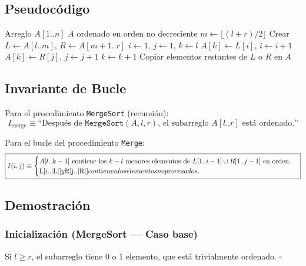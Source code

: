 \documentclass[11pt,a4paper]{article}
\newcommand{\inv}{I}
\begin{document}
\subsection{Pseudocódigo}
\begin{algorithm}[H]
\caption{Merge Sort}
\begin{algorithmic}[1]
\Require Arreglo $A[1..n]$
\Ensure $A$ ordenado en orden no decreciente
        \State $m \gets \lfloor (l + r) / 2 \rfloor$
        \State {}
        \State {}
        \State {}
    \EndIf
\EndProcedure
\Statex
{}
    \State Crear $L \gets A[l..m]$, $R \gets A[m+1..r]$
    \State $i \gets 1$, $j \gets 1$, $k \gets l$
            \State $A[k] \gets L[i]$, $i \gets i+1$
        \Else
            \State $A[k] \gets R[j]$, $j \gets j+1$
        \EndIf
        \State $k \gets k + 1$
    \EndWhile
    \State Copiar elementos restantes de $L$ o $R$ en $A$
\EndProcedure
\end{algorithmic}
\end{algorithm}

\subsection{Invariante de Bucle}

Para el procedimiento \texttt{MergeSort} (recursión):
\[
\inv_{\text{merge}} \equiv \text{``Después de } \texttt{MergeSort}(A, l, r)\text{, el subarreglo } A[l..r] \text{ está ordenado.''}
\]

Para el bucle del procedimiento \texttt{Merge}:
\[
\boxed{\inv(i,j) \equiv \begin{cases}
A[l..k-1] \text{ contiene los } k-l \text{ menores elementos de } L[1..i-1] \cup R[1..j-1] \text{ en orden.}\\
$L[i..|L|]$ y $R[j..|R|]$ contienen los elementos no procesados.
\end{cases}}
\]

\subsection{Demostración}

\subsubsection{Inicialización (MergeSort --- Caso base)}
Si $l \geq r$, el subarreglo tiene 0 o 1 elemento, que está trivialmente ordenado. $\square$
\end{document}
